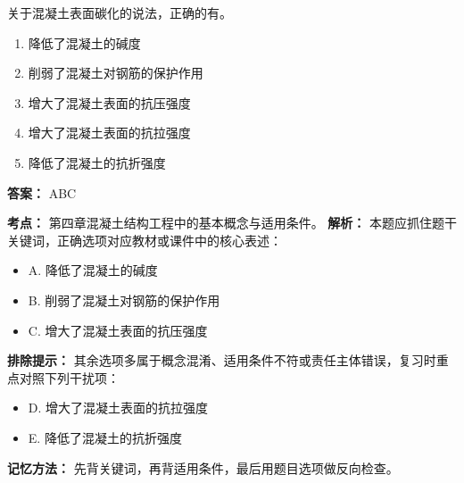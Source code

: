 \documentclass[UTF8,fontset=fandol,11pt]{ctexart}
\begin{document}
\vspace{0.2em}

\begin{quizbox}[title={第 65 题}]
关于混凝土表面碳化的说法，正确的有。\\
\begin{enumerate}[label=\Alph*.]
\item 降低了混凝土的碱度
\item 削弱了混凝土对钢筋的保护作用
\item 增大了混凝土表面的抗压强度
\item 增大了混凝土表面的抗拉强度
\item 降低了混凝土的抗折强度
\end{enumerate}
\textbf{答案：} ABC
\vspace{0.25em}
\begin{answerbox}[title={考点解析}]
\textbf{考点：} 第四章混凝土结构工程中的基本概念与适用条件。
\textbf{解析：} 本题应抓住题干关键词，正确选项对应教材或课件中的核心表述：
\begin{itemize}
\item A. 降低了混凝土的碱度
\item B. 削弱了混凝土对钢筋的保护作用
\item C. 增大了混凝土表面的抗压强度
\end{itemize}
\textbf{排除提示：} 其余选项多属于概念混淆、适用条件不符或责任主体错误，复习时重点对照下列干扰项：
\begin{itemize}
\item D. 增大了混凝土表面的抗拉强度
\item E. 降低了混凝土的抗折强度
\end{itemize}
\textbf{记忆方法：} 先背关键词，再背适用条件，最后用题目选项做反向检查。
\end{answerbox}
\end{quizbox}

\vspace{0.2em}
\end{document}
